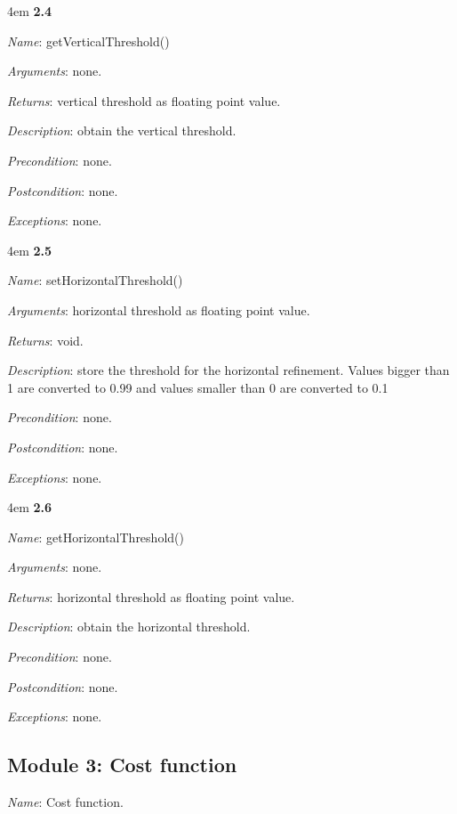 \documentclass[notitlepage]{article}
\begin{document}
\begin{flushleft}
\par
\begingroup
\leftskip4em
\textbf{2.4} 

\textit{Name}: getVerticalThreshold()

\textit{Arguments}: none.

\textit{Returns}: vertical threshold as floating point value.

\textit{Description}: obtain the vertical threshold.

\textit{Precondition}: none.

\textit{Postcondition}: none.

\textit{Exceptions}: none.
\par
\endgroup



\par
\begingroup
\leftskip4em
\textbf{2.5} 

\textit{Name}: setHorizontalThreshold()

\textit{Arguments}: horizontal threshold as floating point value.

\textit{Returns}: void.

\textit{Description}: store the threshold for the horizontal refinement. Values bigger than 1 are converted to 0.99 and values smaller than 0 are converted to 0.1

\textit{Precondition}: none.

\textit{Postcondition}: none.

\textit{Exceptions}: none.
\par
\endgroup


\par
\begingroup
\leftskip4em
\textbf{2.6} 

\textit{Name}: getHorizontalThreshold()

\textit{Arguments}: none.

\textit{Returns}: horizontal threshold as floating point value.

\textit{Description}: obtain the horizontal threshold.

\textit{Precondition}: none.

\textit{Postcondition}: none.

\textit{Exceptions}: none.
\par
\endgroup


\subsection{Module 3: Cost function}
\textit{Name}: Cost function.


\end{flushleft}
\end{document}
